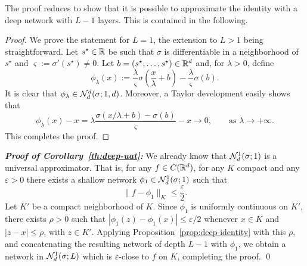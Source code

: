 The proof reduces to show that it is possible to approximate the identity with a deep network with $L-1$ layers. This is contained in the following.


\begin{proof}
   We prove the statement for $L=1$, the extension to $L>1$ being straightforward.
   Let $s^\star\in \mathbb{R}$ be such that $\sigma$ is differentiable in a neighborhood of $s^\star$ and $\varsigma:=\sigma'(s^\star)\neq 0$.
    Let $b=(s^\star,\ldots,s^\star)\in \mathbb{R}^d$ and, for $\lambda>0$, define 
    \begin{equation}
        \phi_\lambda(x) := \frac{\lambda}{\varsigma} \sigma\left(\frac{x}{\lambda} + b \right) - \frac{\lambda}{\varsigma}\sigma(b).
    \end{equation}
    It is clear that $\phi_\lambda\in \mathcal{N}_d^d(\sigma;1,d)$.
    Moreover, a Taylor development easily shows that
    \begin{equation}
        \phi_\lambda(x)-x = \lambda \frac{\sigma(x/\lambda +b)-\sigma(b)}{\varsigma} - x \rightarrow 0, \qquad \text{as }\lambda\to +\infty.
    \end{equation}
    This completes the proof.
\end{proof}


\noindent\textbf{\em Proof of Corollary~\ref{th:deep-uat}:}
    We already know that $\mathcal{N}_d^1(\sigma;1)$ is a universal approximator. That is, for any $f\in C(\mathbb{R}^d)$, for any $K$ compact and any $\varepsilon>0$ there exists a shallow network $\phi_1\in \mathcal{N}_d^1(\sigma;1)$ such that 
    \begin{equation}
        \| f - \phi_1\|_K \le \frac\varepsilon2.
    \end{equation}
    Let $K'$ be a compact neighborhood of $K$. Since $\phi_1$ is uniformly continuous on $K'$, there exists $\rho>0$ such that $|\phi_1(z)-\phi_1(x)|\le \varepsilon/2$ whenever $x\in K$ and $|z-x|\le\rho$, with $z\in K'$. Applying Proposition~\ref{prop:deep-identity} with this $\rho$, and concatenating the resulting network of depth $L-1$ with $\phi_1$, we obtain a network in $\mathcal{N}_d^1(\sigma;L)$ which is $\varepsilon$-close to $f$ on $K$, completing the proof.
\qed

